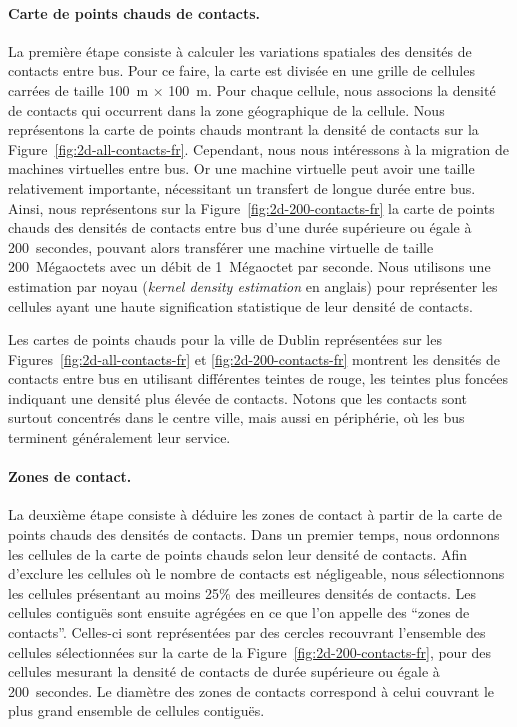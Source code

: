  
\paragraph{Carte de points chauds de contacts.} 
La première étape consiste à calculer les variations spatiales des densités de contacts entre bus. Pour ce faire, la carte est divisée en une grille de cellules carrées de taille 100~m $\times$ 100~m. Pour chaque cellule, nous associons la densité de contacts qui occurrent dans la zone géographique de la cellule. Nous représentons la carte de points chauds montrant la densité de contacts sur la Figure~\ref{fig:2d-all-contacts-fr}. Cependant, nous nous intéressons à la migration de machines virtuelles entre bus. Or une machine virtuelle peut avoir une taille relativement importante, nécessitant un transfert de longue durée entre bus. Ainsi, nous représentons sur la Figure~\ref{fig:2d-200-contacts-fr} la carte de points chauds des densités de contacts entre bus d’une durée supérieure ou égale à 200~secondes, pouvant alors transférer une machine virtuelle de taille 200~Mégaoctets avec un débit de 1~Mégaoctet par seconde. Nous utilisons une estimation par noyau (\textit{kernel density estimation} en anglais) pour représenter les cellules ayant une haute signification statistique de leur densité de contacts.  
 
 
Les cartes de points chauds pour la ville de Dublin représentées sur les Figures~\ref{fig:2d-all-contacts-fr} et \ref{fig:2d-200-contacts-fr} montrent les densités de contacts entre bus en utilisant différentes teintes de rouge, les teintes plus foncées indiquant une densité plus élevée de contacts. Notons que les contacts sont surtout concentrés dans le centre ville, mais aussi en périphérie, où les bus terminent généralement leur service.  
 
 
\paragraph{Zones de contact.} 
La deuxième étape consiste à déduire les zones de contact à partir de la carte de points chauds des densités de contacts. Dans un premier temps, nous ordonnons les cellules de la carte de points chauds selon leur densité de contacts. Afin d’exclure les cellules où le nombre de contacts est négligeable, nous sélectionnons les cellules présentant au moins 25\% des meilleures densités de contacts. Les cellules contiguës sont ensuite agrégées en ce que l’on appelle des ``zones de contacts''. Celles-ci sont représentées par des cercles recouvrant l’ensemble des cellules sélectionnées sur la carte de la Figure~\ref{fig:2d-200-contacts-fr}, pour des cellules mesurant la densité de contacts de durée supérieure ou égale à 200~secondes. Le diamètre des zones de contacts correspond à celui couvrant le plus grand ensemble de cellules contiguës. 
 
